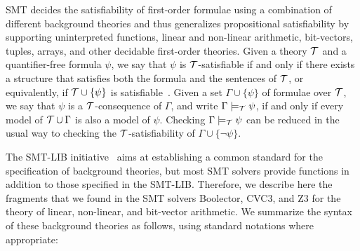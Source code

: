 \documentclass[a4paper]{llncs}
\begin{document}
SMT decides the satisfiability of first-order formulae using a
combination of different background theories and thus generalizes propositional
satisfiability by supporting uninterpreted functions, linear and non-linear
arithmetic, bit-vectors, tuples, arrays, and other decidable first-order
theories. Given a theory ${\cal T}$ and a quantifier-free formula $\psi$, we
say that $\psi$ is $\cal T$-satisfiable if and only if there exists a structure
that satisfies both the formula and the sentences of ${\cal T}$, or
equivalently, if ${\cal T}\cup \{\psi\}$ is satisfiable~\cite{Bradley07}. Given
a set $\Gamma\cup \{\psi\}$ of formulae over $\cal T$, we say that $\psi$ is a
$\cal T$-consequence of $\Gamma$, and write $\Gamma\models_{\cal T}\psi$, if
and only if every model of ${\cal T}\cup\Gamma$ is also a model of $\psi$.
Checking $\Gamma\models_{\cal T}\psi$ can be reduced in the usual way to
checking the $\cal T$-satisfiability of $\Gamma\cup\{\neg\psi\}$.

The SMT-LIB initiative~\cite{smtlib09} aims at establishing a common standard 
for the specification of background theories, but most SMT solvers provide functions 
in addition to those specified in the SMT-LIB. Therefore, we describe here the fragments 
that we found in the SMT solvers Boolector, CVC3, and Z3 for the theory of linear, non-linear, 
and bit-vector arithmetic. We summarize the syntax of these background theories as follows, 
using standard notations where appropriate:
\end{document}
